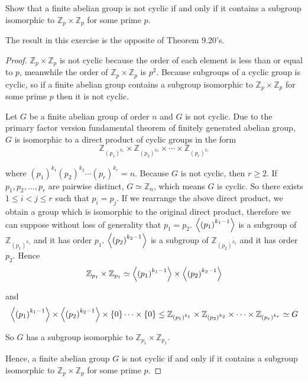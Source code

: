 \begin{exercise}
    Show that a finite abelian group is not cyclic if and only if it contains a subgroup isomorphic to $\mathbb{Z}_{p}\times\mathbb{Z}_{p}$ for some prime $p$.
\end{exercise}

The result in this exercise is the opposite of Theorem 9.20's.

\begin{proof}
    $\mathbb{Z}_{p}\times\mathbb{Z}_{p}$ is not cyclic because the order of each element is less than or equal to $p$, meanwhile the order of $\mathbb{Z}_{p}\times\mathbb{Z}_{p}$ is $p^{2}$. Because subgroups of a cyclic group is cyclic, so if a finite abelian group contains a subgroup isomorphic to $\mathbb{Z}_{p}\times\mathbb{Z}_{p}$ for some prime $p$ then it is not cyclic.

    Let $G$ be a finite abelian group of order $n$ and $G$ is not cyclic. Due to the primary factor version fundamental theorem of finitely generated abelian group, $G$ is isomorphic to a direct product of cyclic groups in the form
    \[
        \mathbb{Z}_{{(p_{1})}^{k_{1}}}
        \times
        \mathbb{Z}_{{(p_{2})}^{k_{2}}}
        \times
        \cdots
        \times
        \mathbb{Z}_{{(p_{r})}^{k_{r}}}
    \]

    where ${(p_{1})}^{k_{1}}{(p_{2})}^{k_{2}}\cdots {(p_{r})}^{k_{r}} = n$. Because $G$ is not cyclic, then $r\geq 2$. If $p_{1}, p_{2}, \ldots, p_{r}$ are pairwise distinct, $G \simeq \mathbb{Z}_{n}$, which means $G$ is cyclic. So there exists $1\leq i < j\leq r$ such that $p_{i} = p_{j}$. If we rearrange the above direct product, we obtain a group which is isomorphic to the original direct product, therefore we can suppose without loss of generality that $p_{1} = p_{2}$. $\left\langle{{(p_{1})}^{k_{1} - 1}}\right\rangle$ is a subgroup of $\mathbb{Z}_{{(p_{1})}^{k_{1}}}$ and it has order $p_{1}$. $\left\langle{{(p_{2})}^{k_{2} - 1}}\right\rangle$ is a subgroup of $\mathbb{Z}_{{(p_{2})}^{k_{2}}}$ and it has order $p_{2}$. Hence
    \[
        \mathbb{Z}_{p_{1}} \times \mathbb{Z}_{p_{1}} \simeq
        \left\langle{{(p_{1})}^{k_{1} - 1}}\right\rangle \times \left\langle{{(p_{2})}^{k_{2} - 1}}\right\rangle
    \]

    and
    \[
        \left\langle{{(p_{1})}^{k_{1} - 1}}\right\rangle
        \times
        \left\langle{{(p_{2})}^{k_{2} - 1}}\right\rangle
        \times
        \{0\}
        \cdots
        \times
        \{0\}
        \leq
        \mathbb{Z}_{{(p_{1})}^{k_{1}}}
        \times
        \mathbb{Z}_{{(p_{2})}^{k_{2}}}
        \times
        \cdots
        \times
        \mathbb{Z}_{{(p_{r})}^{k_{r}}} \simeq G
    \]

    So $G$ has a subgroup isomorphic to $\mathbb{Z}_{p_{1}} \times \mathbb{Z}_{p_{1}}$.

    Hence, a finite abelian group $G$ is not cyclic if and only if it contains a subgroup isomorphic to $\mathbb{Z}_{p}\times\mathbb{Z}_{p}$ for some prime $p$.
\end{proof}

